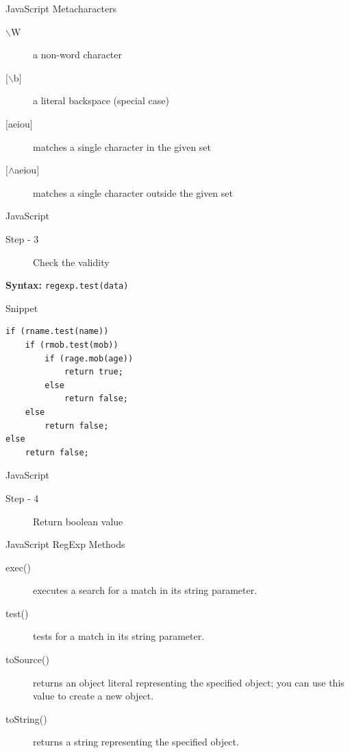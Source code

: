 \documentclass[14pt]{beamer}
\begin{document}
\begin{frame}{JavaScript}
Metacharacters
\begin{description}
 \item [$\backslash$W] a non-word character
 \item [$\lbrack$$\backslash$b$\rbrack$] a literal backspace (special case)
 \item [$\lbrack$aeiou$\rbrack$] matches a single character in the given set
 \item [$\lbrack$$\wedge$aeiou$\rbrack$] matches a single character outside the given set
\end{description}
\end{frame}

\begin{frame}[fragile]{JavaScript}
\begin{description}
 \item [Step - 3] Check the validity
\end{description}
\textbf{Syntax:} \lstinline!regexp.test(data)!
\begin{block}{Snippet}
\begin{lstlisting}
if (rname.test(name))
    if (rmob.test(mob))
        if (rage.mob(age))
            return true;
        else
            return false;
    else
        return false;
else
    return false;
\end{lstlisting}
\end{block}
\end{frame}

\begin{frame}{JavaScript}
\begin{description}
 \item [Step - 4] Return boolean value
\end{description}
\end{frame}

\begin{frame}{JavaScript}
RegExp Methods
\begin{description}
 \item [exec()] executes a search for a match in its string parameter.
 \item [test()] tests for a match in its string parameter.
 \item [toSource()] returns an object literal representing the specified object; you can use this value to create a new object.
 \item [toString()] returns a string representing the specified object.
\end{description}
\end{frame}
\end{document}
